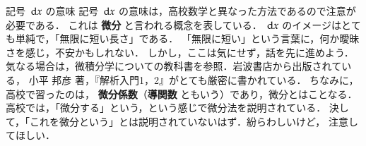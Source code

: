                 \begin{memo}{記号 $\,\mathrm{d} x$ の意味}
                    記号 $\,\mathrm{d} x$ の意味は，高校数学と異なった方法であるので注意が必要である．
                    これは \textbf{微分} と言われる概念を表している．
                    $\,\mathrm{d} x$ のイメージはとても単純で，「無限に短い長さ」である．
                    「無限に短い」という言葉に，何か曖昧さを感じ，不安かもしれない．
                    しかし，ここは気にせず，話を先に進めよう．
                    気なる場合は，微積分学についての教科書を参照．岩波書店から出版されている，
                    小平 邦彦 著，『解析入門1，2』がとても厳密に書かれている．
                    ちなみに，高校で習ったのは，
                    \textbf{微分係数}（\textbf{導関数} ともいう）であり，微分とはことなる．
                    高校では，「微分する」という，という感じで微分法を説明されている．
                    決して，「これを微分という」とは説明されていないはず．紛らわしいけど，
                    注意してほしい．
                \end{memo}
